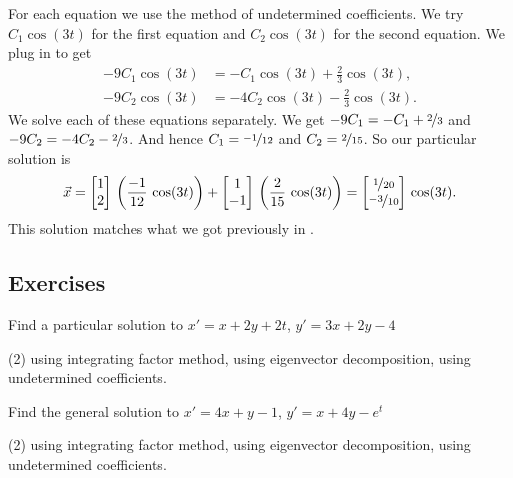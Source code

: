 \begin{example}
\begin{equation*}
\end{equation*}
For each equation we use the method of undetermined coefficients.
We 
try $C_1 \cos (3t)$ for the first equation and $C_2 \cos (3t)$ for the second
equation.  We plug in to get
\begin{align*}
- 9 C_1 \cos (3t) & = - C_1 \cos (3t) + \frac{2}{3} \cos (3t) , \\
- 9 C_2 \cos (3t) & = - 4 C_2 \cos (3t) - \frac{2}{3} \cos (3t) .
\end{align*}
We solve 
each of these equations separately.  We get
$- 9 C_1 = - C_1 + \nicefrac{2}{3}$ and
$- 9 C_2 = - 4C_2 - \nicefrac{2}{3}$.  And hence $C_1 = \nicefrac{-1}{12}$
and $C_2 = \nicefrac{2}{15}$.
So our particular solution is
\begin{equation*}
\vec{x} =
\begin{bmatrix} 1 \\
2 \end{bmatrix} \,
\left( \frac{-1}{12} \, \cos (3t) \right)
+
\begin{bmatrix} 1 \\
-1 \end{bmatrix} \,
\left( \frac{2}{15} \, \cos (3t) \right)
=
\begin{bmatrix} \nicefrac{1}{20} \\
\nicefrac{-3}{10} \end{bmatrix} \,
\cos (3t) .
\end{equation*}
This solution matches what we got previously in .
\end{example}

\subsection{Exercises}

\begin{exercise}
Find a particular solution to
$x' = x+ 2y +2t$, 
$y' = 3x + 2y -4$
\begin{tasks}(2)
\task using integrating factor method,
\task using eigenvector decomposition,
\task using undetermined coefficients.
\end{tasks}
\end{exercise}

\begin{exercise}
Find the general solution to
$x' = 4x+ y -1$, 
$y' = x + 4y -e^t$
\begin{tasks}(2)
\task using integrating factor method,
\task using eigenvector decomposition,
\task using undetermined coefficients.
\end{tasks}
\end{exercise}

